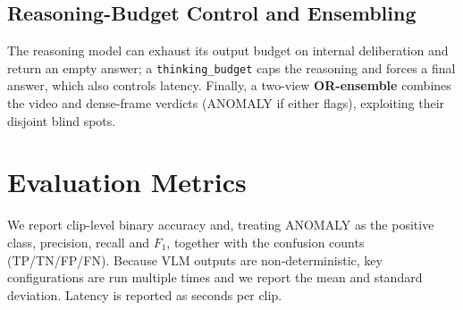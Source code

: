 \subsection{Reasoning-Budget Control and Ensembling}
The reasoning model can exhaust its output budget on internal deliberation and return an
empty answer; a \texttt{thinking\_budget} caps the reasoning and forces a final answer,
which also controls latency. Finally, a two-view \textbf{OR-ensemble} combines the video
and dense-frame verdicts (ANOMALY if either flags), exploiting their disjoint blind
spots.

\section{Evaluation Metrics}
We report clip-level binary accuracy and, treating ANOMALY as the positive class,
precision, recall and $F_1$, together with the confusion counts (TP/TN/FP/FN). Because
VLM outputs are non-deterministic, key configurations are run multiple times and we
report the mean and standard deviation. Latency is reported as seconds per clip.
